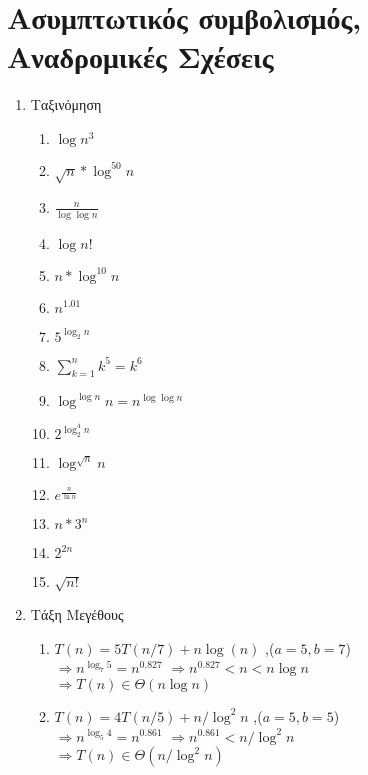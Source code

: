 \documentclass[a4paper,10pt]{article} \usepackage{anysize}
\newcommand{\tab}{\hspace*{3em}}
\begin{document}
\renewcommand{\labelenumi}{\roman{enumi})}
\renewcommand{\labelenumii}{(\arabic{enumii})}



\section{Ασυμπτωτικός συμβολισμός, Αναδρομικές
Σχέσεις} \setcounter{section}{1}
\begin{enumerate}

\item Ταξινόμηση
\begin{enumerate}
\item $\log {n^3}$
\item $\sqrt{n}*\log^{50}{n} $
\item $\frac{n}{\log{\log{n}} } $
\item $\log{n!} $
\item $n*\log^{10}{n} $
\item $n^{1.01} $
\item $5^{\log_{2}{n}} $
\item $\sum_{k=1}^n{k^5} = {k^6}$
\item $\log^{\log{n}}{n} = n^{\log{\log{n}} } $
\item $2^{\log_2^4{n}} $
\item $\log^{\sqrt{n}}{n} $
\item $e^{\frac{n}{\ln{n}} } $
\item $n*3^n $
\item $2^{2n} $
\item $\sqrt{n!} $
\end{enumerate}

\item Τάξη Μεγέθους
\begin{enumerate}
\item $T(n)=5T(n/7)+n\log(n)$ ,\tab ($a=5 , b=7$) \\
$\Rightarrow n^{\log _7 {5}} = n^{0.827}$
$\Rightarrow n^{0.827} < n < n\log{n}$\\
$\Rightarrow T(n) \in \Theta(n\log{n})$

\item $T(n) = 4T(n/5)+n/\log^2{n}$ ,\tab ($a=5 , b=5$)\\
$\Rightarrow n^{\log_5 {4}} = n^{0.861}$
$\Rightarrow n^{0.861} < n/\log^2{n}$\\
$\Rightarrow T(n) \in \Theta(n/\log^2{n})$


\end{enumerate}
\end{enumerate}
\end{document}
